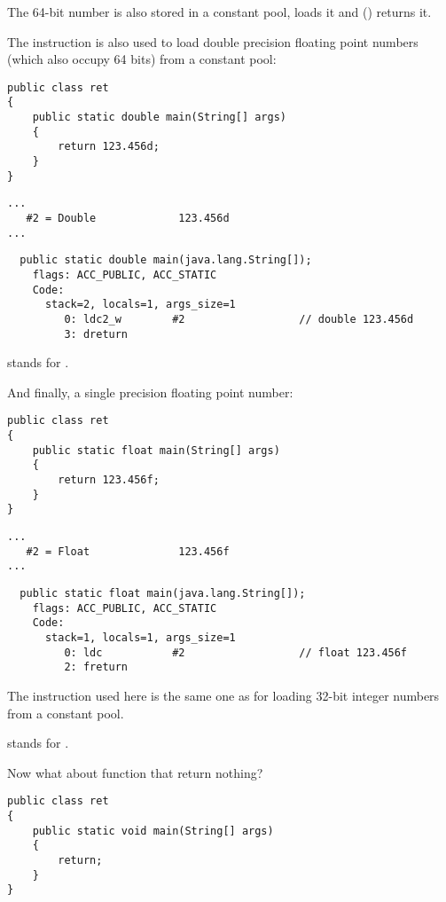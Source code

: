 The 64-bit number is also stored in a constant pool,  loads it and  
() returns it.

The  instruction is also used to load double precision floating point numbers 
(which also occupy 64 bits) from a constant pool:

\begin{lstlisting}[style=customjava]
public class ret
{
	public static double main(String[] args)
	{
		return 123.456d;
	}
}
\end{lstlisting}

\begin{lstlisting}[caption=Constant pool]
...
   #2 = Double             123.456d
...
\end{lstlisting}

\begin{lstlisting}
  public static double main(java.lang.String[]);
    flags: ACC_PUBLIC, ACC_STATIC
    Code:
      stack=2, locals=1, args_size=1
         0: ldc2_w        #2                  // double 123.456d
         3: dreturn       
\end{lstlisting}

 stands for .

And finally, a single precision floating point number:

\begin{lstlisting}[style=customjava]
public class ret
{
	public static float main(String[] args)
	{
		return 123.456f;
	}
}
\end{lstlisting}

\begin{lstlisting}[caption=Constant pool]
...
   #2 = Float              123.456f
...
\end{lstlisting}

\begin{lstlisting}
  public static float main(java.lang.String[]);
    flags: ACC_PUBLIC, ACC_STATIC
    Code:
      stack=1, locals=1, args_size=1
         0: ldc           #2                  // float 123.456f
         2: freturn       
\end{lstlisting}

The  instruction used here is the same one as for loading 32-bit integer numbers
from a constant pool.

 stands for .

Now what about function that return nothing?

\begin{lstlisting}[style=customjava]
public class ret
{
	public static void main(String[] args) 
	{
		return;
	}
}
\end{lstlisting}


